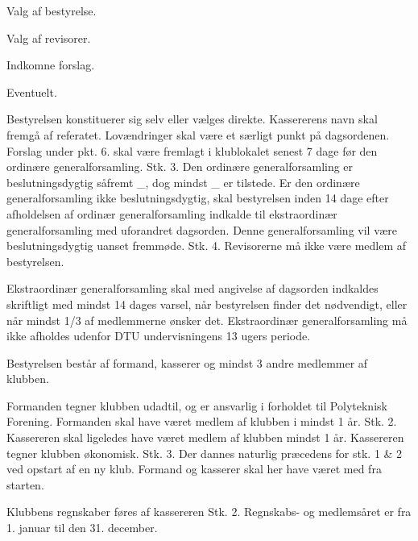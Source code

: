 \begin{list}
\begin{list}{•}
\item Valg af bestyrelse.
\item Valg af revisorer.
\item Indkomne forslag.
\item Eventuelt.
\end{list}
Bestyrelsen konstituerer sig selv eller vælges direkte. Kassererens navn skal fremgå af referatet. Lovændringer
skal være et særligt punkt på dagsordenen. Forslag under pkt. 6. skal være fremlagt i klublokalet senest 7 dage
før den ordinære generalforsamling.
Stk. 3. Den ordinære generalforsamling er beslutningsdygtig såfremt \_, 
dog mindst \_ er tilstede. Er
den ordinære generalforsamling ikke beslutningsdygtig, skal bestyrelsen inden 14 dage efter afholdelsen af
ordinær generalforsamling indkalde til ekstraordinær generalforsamling med uforandret dagsorden. Denne
generalforsamling vil være beslutningsdygtig uanset fremmøde.
Stk. 4. Revisorerne må ikke være medlem af bestyrelsen.
\item Ekstraordinær generalforsamling skal med angivelse af dagsorden indkaldes skriftligt med mindst 14 dages
varsel, når bestyrelsen finder det nødvendigt, eller når mindst 1/3 af medlemmerne ønsker det. Ekstraordinær
generalforsamling må ikke afholdes udenfor DTU undervisningens 13 ugers periode.
\item Bestyrelsen består af formand, kasserer og mindst 3 andre medlemmer af klubben.
\item Formanden tegner klubben udadtil, og er ansvarlig i forholdet til Polyteknisk Forening. Formanden skal have
været medlem af klubben i mindst 1 år.
Stk. 2. Kassereren skal ligeledes have været medlem af klubben mindst 1 år. Kassereren tegner klubben
økonomisk.
Stk. 3. Der dannes naturlig præcedens for stk. 1 \& 2 ved opstart af en ny klub. Formand og kasserer skal her
have været med fra starten.
\item Klubbens regnskaber føres af kassereren
Stk. 2. Regnskabs- og medlemsåret er fra 1. januar til den 31. december.


\end{list}

